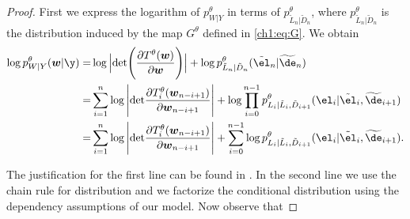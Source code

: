 \begin{proof}
    First we express the logarithm of $p^\theta_{W|Y}$ in terms of $p^\theta_{\tilde{L}_n|\tilde{D}_n}$, where  $p^\theta_{\tilde{L}_n|\tilde{D}_n}$ is the distribution induced by the map $G^\theta$ defined in \eqref{ch1:eq:G}. We obtain
    \begin{equation}\label{ch1:eq:equationone}
    \begin{aligned}
         \log p^\theta_{W|Y}(\boldsymbol{w} | \y)=& \log \Big|\text{det}\Bigg(\frac{\partial T^\theta(\boldsymbol{w})}{\partial \boldsymbol{w}}\Bigg)\Big| + \log{p^\theta_{\tilde{L}_n|\tilde{D}_n}(\tilde{\el}_n|\widetilde{\de}_n)} \\ 
        =& \sum_{i=1}^{n}\log{\Bigg|\text{det}\frac{\partial T_i^{\theta}(\boldsymbol{w}_{n-i+1})}{\partial \boldsymbol{w}_{n-i+1}}\Bigg|}+ \log{\prod_{i=0}^{n-1}p^\theta_{L_i|\tilde{L}_{i},\tilde D_{i+1}}(\el_i|\tilde{\el}_{i},\widetilde \de_{i+1})} \\
        =& \sum_{i=1}^{n}\log{\Bigg|\text{det}\frac{\partial T_i^{\theta}(\boldsymbol{w}_{n-i+1})}{\partial \boldsymbol{w}_{n-i+1}}\Bigg|}+ \sum_{i=0}^{n-1}\log{p_{L_i|\tilde{L}_{i},\tilde D_{i+1}}^\theta(\el_i|\tilde{\el}_{i},\widetilde \de_{i+1})}.
    \end{aligned}
    \end{equation}
    
    The justification for the first line can be found in  \cite[Section 3]{Dual-Glow}. In the second line we use the chain rule for distribution and we factorize the conditional distribution using the dependency assumptions of our model. Now observe that
    

\end{proof}
